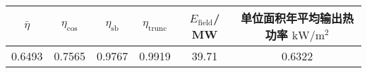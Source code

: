 \begin{tabular}{|cccccc|}
\hline
\(\bar \eta\) & \(\eta _{\cos}\) & \(\eta _{\mathrm{s b}}\) & \(\eta _{\mathrm{trunc}}\) & \(E_{\mathrm{field}}\)/ MW &单位面积年平均输出热功率 \(\mathrm{kW}/\mathrm{m}^{2}\)\\
\hline
0.6493 & 0.7565 & 0.9767 & 0.9919 & 39.71 & 0.6322\\
\hline
\end{tabular}
